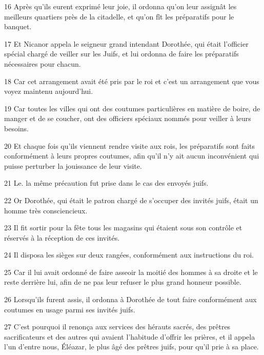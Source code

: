 \par 16 Après qu'ils eurent exprimé leur joie, il ordonna qu'on leur assignât les meilleurs quartiers près de la citadelle, et qu'on fît les préparatifs pour le banquet.

\par 17 Et Nicanor appela le seigneur grand intendant Dorothée, qui était l'officier spécial chargé de veiller sur les Juifs, et lui ordonna de faire les préparatifs nécessaires pour chacun.

\par 18 Car cet arrangement avait été pris par le roi et c'est un arrangement que vous voyez maintenu aujourd'hui.

\par 19 Car toutes les villes qui ont des coutumes particulières en matière de boire, de manger et de se coucher, ont des officiers spéciaux nommés pour veiller à leurs besoins.

\par 20 Et chaque fois qu'ils viennent rendre visite aux rois, les préparatifs sont faits conformément à leurs propres coutumes, afin qu'il n'y ait aucun inconvénient qui puisse perturber la jouissance de leur visite.

\par 21 Le. la même précaution fut prise dans le cas des envoyés juifs.

\par 22 Or Dorothée, qui était le patron chargé de s'occuper des invités juifs, était un homme très consciencieux.

\par 23 Il fit sortir pour la fête tous les magasins qui étaient sous son contrôle et réservés à la réception de ces invités.

\par 24 Il disposa les sièges sur deux rangées, conformément aux instructions du roi.

\par 25 Car il lui avait ordonné de faire asseoir la moitié des hommes à sa droite et le reste derrière lui, afin de ne pas leur refuser le plus grand honneur possible.

\par 26 Lorsqu'ils furent assis, il ordonna à Dorothée de tout faire conformément aux coutumes en usage parmi ses invités juifs.

\par 27 C'est pourquoi il renonça aux services des hérauts sacrés, des prêtres sacrificateurs et des autres qui avaient l'habitude d'offrir les prières, et il appela l'un d'entre nous, Éléazar, le plus âgé des prêtres juifs, pour qu'il prie à sa place.

